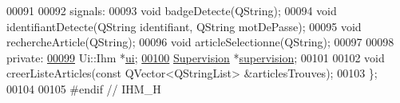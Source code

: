 \begin{DoxyCode}
00091 
00092 signals:
00093     \textcolor{keywordtype}{void} badgeDetecte(QString);
00094     \textcolor{keywordtype}{void} identifiantDetecte(QString identifiant, QString motDePasse);
00095     \textcolor{keywordtype}{void} rechercheArticle(QString);
00096     \textcolor{keywordtype}{void} articleSelectionne(QString);
00097 
00098 \textcolor{keyword}{private}:
\hyperlink{class_ihm_a0ac5f47856566ceeeca1720109bf70ea}{00099}     Ui::Ihm *\hyperlink{class_ihm_a0ac5f47856566ceeeca1720109bf70ea}{ui}; 
\hyperlink{class_ihm_a454ab89ced1b27fcb42d550e443e780c}{00100}     \hyperlink{class_supervision}{Supervision} *\hyperlink{class_ihm_a454ab89ced1b27fcb42d550e443e780c}{supervision}; 
00101 
00102     \textcolor{keywordtype}{void} creerListeArticles(\textcolor{keyword}{const} QVector<QStringList> &articlesTrouves);
00103 \};
00104 
00105 \textcolor{preprocessor}{#endif // IHM\_H}
\end{DoxyCode}
